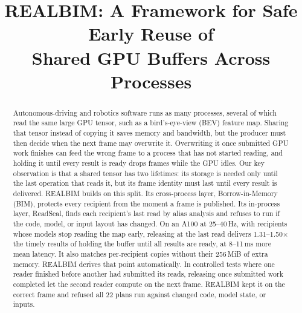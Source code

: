 \documentclass[conference]{IEEEtran}
\newcommand{\sys}{REALBIM}
\newcommand{\MiB}{\,MiB}
\newcommand{\ms}{\,ms}
\newcommand{\Hz}{\,Hz}
\begin{document}
\title{\sys: A Framework for Safe Early Reuse of\\ Shared GPU Buffers Across Processes}

\author{
}

\maketitle

\begin{abstract}
Autonomous-driving and robotics software runs as many processes, several of which read the same large GPU tensor, such as a bird's-eye-view (BEV) feature map. Sharing that tensor instead of copying it saves memory and bandwidth, but the producer must then decide when the next frame may overwrite it. Overwriting it once submitted GPU work finishes can feed the wrong frame to a process that has not started reading, and holding it until every result is ready drops frames while the GPU idles. Our key observation is that a shared tensor has two lifetimes: its storage is needed only until the last operation that reads it, but its frame identity must last until every result is delivered. \sys{} builds on this split. Its cross-process layer, Borrow-in-Memory (BIM), protects every recipient from the moment a frame is published. Its in-process layer, ReadSeal, finds each recipient's last read by alias analysis and refuses to run if the code, model, or input layout has changed. On an A100 at 25--40\Hz, with recipients whose models stop reading the map early, releasing at the last read delivers 1.31--1.50$\times$ the timely results of holding the buffer until all results are ready, at 8--11\ms{} more mean latency. It also matches per-recipient copies without their 256\MiB{} of extra memory. \sys{} derives that point automatically. In controlled tests where one reader finished before another had submitted its reads, releasing once submitted work completed let the second reader compute on the next frame. \sys{} kept it on the correct frame and refused all 22 plans run against changed code, model state, or inputs.
\end{abstract}
\end{document}
